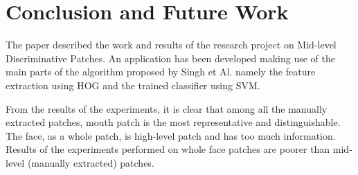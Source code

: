 \section{Conclusion and Future Work}

The paper described the work and results of the research project on Mid-level Discriminative Patches. An application has been developed making use of the main parts of the algorithm proposed by Singh et Al. \cite{Singh2012DiscPat} namely the feature extraction using HOG and the trained classifier using SVM.

From the results of the experiments, it is clear that among all the manually extracted patches, mouth patch is the most representative and distinguishable. The face, as a whole patch, is high-level patch and has too much information. Results of the experiments performed on whole face patches are poorer than mid-level (manually extracted) patches. 

  
